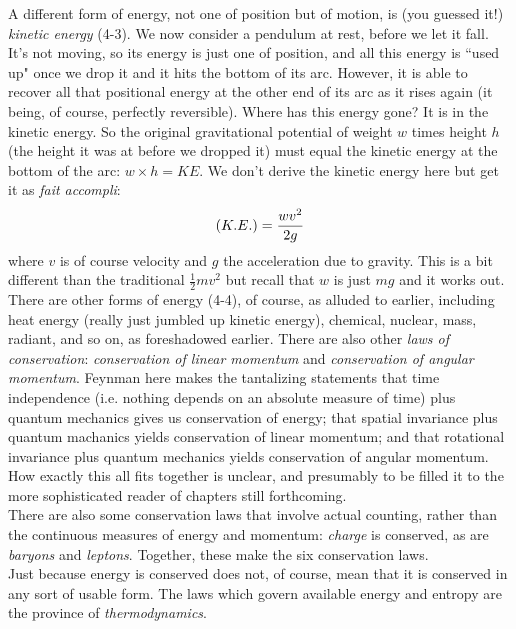 \documentclass[10pt,letterpaper]{article}
\begin{document}
\indent A different form of energy, not one of position but of motion, is (you guessed it!) \textit{kinetic energy} (4-3). We now consider a pendulum at rest, before we let it fall. It's not moving, so its energy is just one of position, and all this energy is ``used up" once we drop it and it hits the bottom of its arc. However, it is able to recover all that positional energy at the other end of its arc as it rises again (it being, of course, perfectly reversible). Where has this energy gone? It is in the kinetic energy. So the original gravitational potential of weight $w$ times height $h$ (the height it was at before we dropped it) must equal the kinetic energy at the bottom of the arc: $w \times h = KE$. We don't derive the kinetic energy here but get it as \textit{fait accompli}:
$$
\textrm(K.E.) = \frac{wv^2}{2g}
$$
where $v$ is of course velocity and $g$ the acceleration due to gravity. This is a bit different than the traditional $\frac{1}{2}mv^2$ but recall that $w$ is just $mg$ and it works out. \\

\indent There are other forms of energy (4-4), of course, as alluded to earlier, including heat energy (really just jumbled up kinetic energy), chemical, nuclear, mass, radiant, and so on, as foreshadowed earlier. There are also other \textit{laws of conservation}: \textit{conservation of linear momentum} and \textit{conservation of angular momentum}. Feynman here makes the tantalizing statements that time independence (i.e. nothing depends on an absolute measure of time) plus quantum mechanics gives us conservation of energy; that spatial invariance plus quantum machanics yields conservation of linear momentum; and that rotational invariance plus quantum mechanics yields conservation of angular momentum. How exactly this all fits together is unclear, and presumably to be filled it to the more sophisticated reader of chapters still forthcoming. \\
\indent There are also some conservation laws that involve actual counting, rather than the continuous measures of energy and momentum: \textit{charge} is conserved, as are \textit{baryons} and \textit{leptons}. Together, these make the six conservation laws. \\
\indent Just because energy is conserved does not, of course, mean that it is conserved in any sort of usable form. The laws which govern available energy and entropy are the province of \textit{thermodynamics}. 
\end{document}
